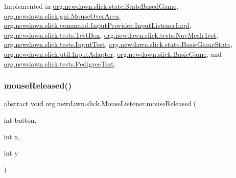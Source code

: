 Implemented in \mbox{\hyperlink{classorg_1_1newdawn_1_1slick_1_1state_1_1_state_based_game_ab6809563aa70d14d4ed26294d248e871}{org.\+newdawn.\+slick.\+state.\+State\+Based\+Game}}, \mbox{\hyperlink{classorg_1_1newdawn_1_1slick_1_1gui_1_1_mouse_over_area_a5d0f752e776cba0ca2a7a651236d6853}{org.\+newdawn.\+slick.\+gui.\+Mouse\+Over\+Area}}, \mbox{\hyperlink{classorg_1_1newdawn_1_1slick_1_1command_1_1_input_provider_1_1_input_listener_impl_a7a660580dd4fbf3042c07d83d88022b7}{org.\+newdawn.\+slick.\+command.\+Input\+Provider.\+Input\+Listener\+Impl}}, \mbox{\hyperlink{classorg_1_1newdawn_1_1slick_1_1tests_1_1_test_box_aa9cf4accae5a92d392913ea607398032}{org.\+newdawn.\+slick.\+tests.\+Test\+Box}}, \mbox{\hyperlink{classorg_1_1newdawn_1_1slick_1_1tests_1_1_nav_mesh_test_ab74b2ac83a83fa278dbfc76a9563b921}{org.\+newdawn.\+slick.\+tests.\+Nav\+Mesh\+Test}}, \mbox{\hyperlink{classorg_1_1newdawn_1_1slick_1_1tests_1_1_input_test_a171626d9985a4dac34a09ad73ec99a1e}{org.\+newdawn.\+slick.\+tests.\+Input\+Test}}, \mbox{\hyperlink{classorg_1_1newdawn_1_1slick_1_1state_1_1_basic_game_state_ae51588d90bde4c509f2c6fccfe212994}{org.\+newdawn.\+slick.\+state.\+Basic\+Game\+State}}, \mbox{\hyperlink{classorg_1_1newdawn_1_1slick_1_1util_1_1_input_adapter_a8c466a6d0e2479d535aa5f435fcc684d}{org.\+newdawn.\+slick.\+util.\+Input\+Adapter}}, \mbox{\hyperlink{classorg_1_1newdawn_1_1slick_1_1_basic_game_af00b33ec970972ecabe458cbc6d66e8a}{org.\+newdawn.\+slick.\+Basic\+Game}}, and \mbox{\hyperlink{classorg_1_1newdawn_1_1slick_1_1tests_1_1_pedigree_test_ae226b491b433eaac6408b764b7e0c9a5}{org.\+newdawn.\+slick.\+tests.\+Pedigree\+Test}}.

\mbox{\label{interfaceorg_1_1newdawn_1_1slick_1_1_mouse_listener_a8d1606869f610664f9299565067d5571}} 
\subsubsection{\texorpdfstring{mouse\+Released()}{mouseReleased()}}
{\footnotesize\ttfamily abstract void org.\+newdawn.\+slick.\+Mouse\+Listener.\+mouse\+Released (\begin{DoxyParamCaption}\item[{int}]{button,  }\item[{int}]{x,  }\item[{int}]{y }\end{DoxyParamCaption})\hspace{0.3cm}{\ttfamily [abstract]}}


